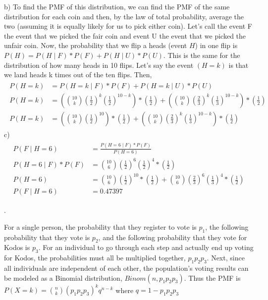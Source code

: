 \documentclass[11pt]{article}
\begin{document}
    b) To find the PMF of this distribution, we can find the PMF of the same distribution for each coin and then, by the law of total probability, average the two (assuming it is equally likely for us to pick either coin). Let's call the event F the event that we picked the fair coin and event U the event that we picked the unfair coin.  Now, the probability that we flip a heads (event $H$) in one flip is $P(H) = P(H \mid F)*P(F) + P(H \mid U)*P(U)$.  This is the same for the distribution of how many heads in 10 flips.  Let's say the event $(H=k)$ is that we land heads k times out of the ten flips.  Then, 
    \begin{gather*}
    \begin{align*}
    P(H=k) &= P(H=k \mid F)*P(F) + P(H=k \mid U)*P(U)\\
    P(H=k) &= (\binom{10}{k}(\frac{1}{2})^k(\frac{1}{2})^{10-k})*(\frac{1}{2}) + (\binom{10}{k}(\frac{2}{3})^k(\frac{1}{3})^{10-k})*(\frac{1}{2})\\
    P(H=k) &= \boxed{(\binom{10}{k}(\frac{1}{2})^{10})*(\frac{1}{2}) + (\binom{10}{k}(\frac{2}{3})^k(\frac{1}{3})^{10-k})*(\frac{1}{2})}
    \end{align*}
    \end{gather*}
\bigskip
    c) 
    \begin{gather*}
    \begin{align*}
    P(F \mid H=6) &= \frac{P(H=6 \mid F)*P(F)}{P(H=6)}\\
    P(H=6 \mid F)*P(F) &= \binom{10}{6}(\frac{1}{2})^6(\frac{1}{2})^{4}*(\frac{1}{2})\\
    P(H=6) &= \binom{10}{6}(\frac{1}{2})^{10}*(\frac{1}{2}) + \binom{10}{6}(\frac{2}{3})^6(\frac{1}{3})^{4}*(\frac{1}{2})\\
    P(F \mid H=6) &= \boxed{0.47397}
    \end{align*}
    \end{gather*}

\bigskip

.

    For a single person, the probability that they register to vote is $p_1$, the following probability that they vote is $p_2$, and the following probability that they vote for Kodos is $p_3$.  For an individual to go through each step and actually end up voting for Kodos, the probabilities must all be multiplied together, $p_1p_2p_3$.  Next, since all individuals are independent of each other, the population's voting results can be modeled as a Binomial distribution, $Binom(n, p_1p_2p_3)$. Thus the PMF is $\boxed{P(X=k) = \binom{n}{k}(p_1p_2p_3)^{k}q^{n-k}}$ where $q = 1 - p_1p_2p_3$
\smallskip	
        
\end{document}

